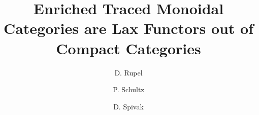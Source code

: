 \documentclass[12pt,oneside,article,draft]{memoir}
\title{Enriched Traced Monoidal Categories are Lax Functors out of Compact Categories}
\author{D. Rupel \and P. Schultz \and D. Spivak}
\begin{document}
\tightlists
\firmlists

\maketitle


\end{document}
